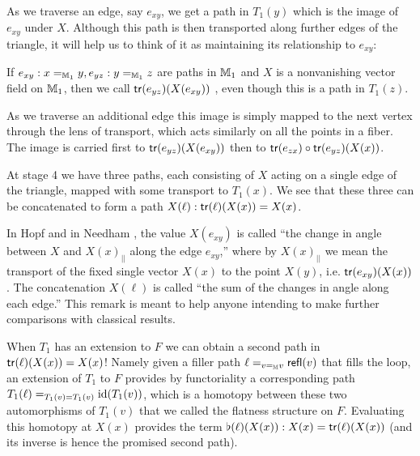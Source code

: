 As we traverse an edge, say \( e_{xy} \), we get a path in \( T_1(y) \) which is the image of \( e_{xy} \) under \( X \). Although this path is then transported along further edges of the triangle, it will help us to think of it as maintaining its relationship to \( e_{xy} \):

\begin{mydef}
If \( e_{xy}:x=_{\mathbb{M}_1} y, e_{yz}:y=_{\mathbb{M}_1}z \) are paths in \( \mathbb{M}_1 \) and \( X \) is a nonvanishing vector field on \( \mathbb{M}_1 \), then we call \( \mathsf{tr}(e_{yz})(X(e_{xy})) \) , even though this is a path in \( T_1(z) \).
\end{mydef}

As we traverse an additional edge this image is simply mapped to the next vertex through the lens of transport, which acts similarly on all the points in a fiber. The image is carried first to \( \mathsf{tr}(e_{yz})(X(e_{xy})) \) then to \( \mathsf{tr}(e_{zx})\circ\mathsf{tr}(e_{yz})(X(x)) \).

At stage 4 we have three paths, each consisting of \( X \) acting on a single edge of the triangle, mapped with some transport to \( T_1(x) \). We see that these three can be concatenated to form a path \( X(\ell):\mathsf{tr}(\ell)(X(x))=X(x) \).

\begin{mynote}
In Hopf \cite{hopf} and in Needham \cite{needham}, the value \( X(e_{xy}) \) is called ``the change in angle between \( X \) and \( X(x)_{||} \) along the edge \( e_{xy} \),'' where by \( X(x)_{||} \) we mean the transport of the fixed single vector \( X(x) \) to the point \( X(y) \), i.e. \( \mathsf{tr}(e_{xy})(X(x)) \). The concatenation \( X(\ell) \) is called ``the sum of the changes in angle along each edge.'' This remark is meant to help anyone intending to make further comparisons with classical results.
\end{mynote}

When \( T_1 \) has an extension to \( F \) we can obtain a second path in \( \mathsf{tr}(\ell)(X(x))=X(x) \)! Namely given a filler path \( \ell=_{v=_{\mathbb{M}} v} \mathsf{refl}(v) \) that fills the loop, an extension of \( T_1 \) to \( F \) provides by functoriality a corresponding path \( T_1(\ell)=_{T_1(v)=T_1(v)}\text{id}(T_1(v)) \), which is a homotopy between these two automorphisms of \( T_1(v) \) that we called the flatness structure on \( F \). Evaluating this homotopy at \( X(x) \) provides the term \( \flat(\ell)(X(x)):X(x)=\mathsf{tr}(\ell)(X(x)) \) (and its inverse is hence the promised second path).

